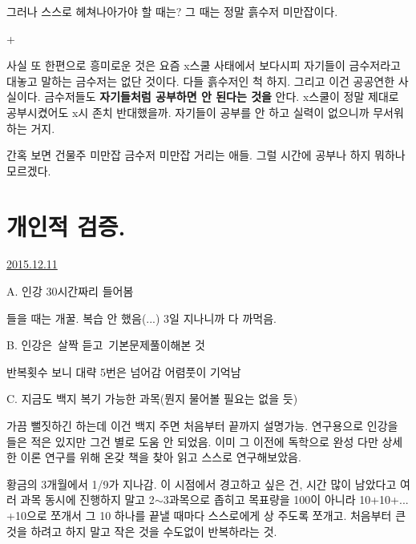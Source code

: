 그러나 스스로 헤쳐나아가야 할 때는? 그 때는 정말 흙수저 미만잡이다.
\vspace{5mm}

+
\vspace{5mm}

사실 또 한편으로 흥미로운 것은 요즘 x스쿨 사태에서 보다시피
자기들이 금수저라고 대놓고 말하는 금수저는 없단 것이다. 다들 흙수저인 척 하지.
그리고 이건 공공연한 사실이다. 금수저들도 \textbf{자기들처럼 공부하면 안 된다는 것을} 안다.
x스쿨이 정말 제대로 공부시켰어도 x시 존치 반대했을까. 자기들이 공부를 안 하고 실력이 없으니까 무서워하는 거지.
\vspace{5mm}

간혹 보면 건물주 미만잡 금수저 미만잡 거리는 애들. 그럴 시간에 공부나 하지 뭐하나 모르겠다.
\vspace{5mm}






\section{개인적 검증.}
\href{https://www.kockoc.com/Apoc/540628}{2015.12.11}

\vspace{5mm}

A. 인강 30시간짜리 들어봄
\vspace{5mm}

들을 때는 개꿀.
복습 안 했음(...)
3일 지나니까 다 까먹음.
\vspace{5mm}

B. 인강은 살짝 듣고 기본문제풀이해본 것
\vspace{5mm}

반복횟수 보니 대략 5번은 넘어감
어렴풋이 기억남
\vspace{5mm}

C. 지금도 백지 복기 가능한 과목(뭔지 물어볼 필요는 없을 듯)
\vspace{5mm}

가끔 뻘짓하긴 하는데 이건 백지 주면 처음부터 끝까지 설명가능.
연구용으로 인강을 들은 적은 있지만 그건 별로 도움 안 되었음. 이미 그 이전에 독학으로 완성
다만 상세한 이론 연구를 위해 온갖 책을 찾아 읽고 스스로 연구해보았음.
\vspace{5mm}

황금의 3개월에서 1/9가 지나감.
이 시점에서 경고하고 싶은 건, 시간 많이 남았다고 여러 과목 동시에 진행하지 말고
2$\sim$3과목으로 좁히고 목표량을 100이 아니라 10+10+... +10으로 쪼개서 그 10 하나를 끝낼 때마다 스스로에게 상 주도록 쪼개고.
처음부터 큰 것을 하려고 하지 말고 작은 것을 수도없이 반복하라는 것.
\vspace{5mm}

